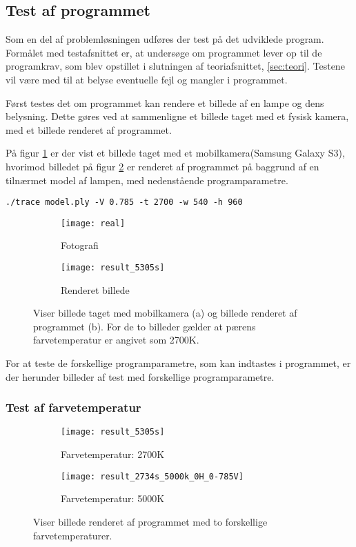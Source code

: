 \subsection{Test af programmet}
\label{sec:test}

Som en del af problemløsningen udføres der test på det udviklede program. Formålet med testafsnittet er, at undersøge om programmet lever op til de programkrav, som blev opstillet i slutningen af teoriafsnittet, \ref{sec:teori}. Testene vil være med til at belyse eventuelle fejl og mangler i programmet.

Først testes det om programmet kan rendere et billede af en lampe og dens belysning. Dette gøres ved at sammenligne et billede taget med et fysisk kamera, med et billede renderet af programmet.

På figur \ref{fig:real} er der vist et billede taget med et mobilkamera(Samsung Galaxy S3), hvorimod billedet på figur \ref{fig:fake} er renderet af programmet på baggrund af en tilnærmet model af lampen, med nedenstående programparametre.
\begin{lstlisting}
./trace model.ply -V 0.785 -t 2700 -w 540 -h 960
\end{lstlisting}

\begin{figure}[H]
\centering
\begin{subfigure}{.5\textwidth}
  \centering
  \texttt{[image: real]}
  \caption{Fotografi}
  \label{fig:real}
\end{subfigure}%
\begin{subfigure}{.5\textwidth}
  \centering
  \texttt{[image: result\_5305s]}
  \caption{Renderet billede}
  \label{fig:fake}
\end{subfigure}
\caption{Viser billede taget med mobilkamera (a) og billede renderet af programmet (b). For de to billeder gælder at pærens farvetemperatur er angivet som 2700K.}
\label{fig:test_real_fake}
\end{figure}

For at teste de forskellige programparametre, som kan indtastes i programmet, er der herunder billeder af test med forskellige programparametre.

\subsubsection{Test af farvetemperatur}
\begin{figure}[H]
\centering
\begin{subfigure}{.5\textwidth}
  \centering
  \texttt{[image: result\_5305s]}
  \caption{Farvetemperatur: 2700K}
  \label{fig:kelvin2700}
\end{subfigure}%
\begin{subfigure}{.5\textwidth}
  \centering
  \texttt{[image: result\_2734s\_5000k\_0H\_0-785V]}
  \caption{Farvetemperatur: 5000K}
  \label{fig:kelvin5000}
\end{subfigure}
\caption{Viser billede renderet af programmet med to forskellige farvetemperaturer.}
\label{fig:farvetemperatur}
\end{figure}


